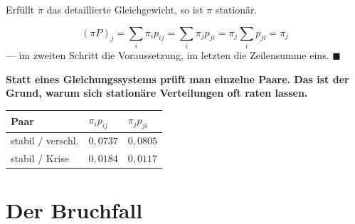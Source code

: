 \begin{merksatz}
Erfüllt $\pi$ das detaillierte Gleichgewicht, so ist $\pi$ stationär.

\[ (\pi P)_j = \sum_i \pi_i p_{ij} = \sum_i \pi_j p_{ji} = \pi_j \sum_i p_{ji} = \pi_j \]
--- im zweiten Schritt die Voraussetzung, im letzten die Zeilensumme eins. $\blacksquare$

\begin{center}
\begin{minipage}{0.9\textwidth}
\textbf{Statt eines Gleichungssystems prüft man einzelne Paare. Das ist der Grund, warum sich stationäre Verteilungen oft raten lassen.}
\end{minipage}
\end{center}

\begin{center}
{\small
\renewcommand{\arraystretch}{1.48}
\begin{tabular}{@{}P{2.0cm}P{2.4cm}P{2.4cm}@{}}
\toprule
\textbf{Paar} & $\pi_i p_{ij}$ & $\pi_j p_{ji}$\\
\midrule
stabil / verschl. & $0{,}0737$ & $0{,}0805$\\
stabil / Krise & $0{,}0184$ & $0{,}0117$\\
\bottomrule
\end{tabular}}
\end{center}

\begin{center}
\begin{minipage}{0.88\textwidth}
\end{minipage}
\end{center}
\end{merksatz}

\section{Der Bruchfall}

